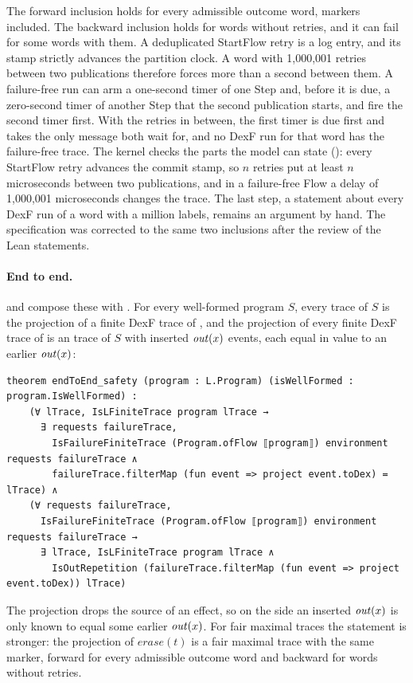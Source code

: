 The forward inclusion holds for every admissible outcome word, markers
included. The backward inclusion holds for words without retries, and it
can fail for some words with them. A deduplicated StartFlow retry is a log
entry, and its stamp strictly advances the partition clock. A word with
1,000,001 retries between two publications therefore forces more than a
second between them. A failure-free run can arm a one-second timer of one
Step and, before it is due, a zero-second timer of another Step that the
second publication starts, and fire the second timer first. With the
retries in between, the first timer is due first and takes the only
message both wait for, and no DexF run for that word has the failure-free
trace. The kernel checks the parts the model can state
(): every StartFlow retry advances
the commit stamp, so $n$ retries put at least $n$ microseconds between two
publications, and in a failure-free Flow a delay of 1,000,001 microseconds
changes the trace. The last step, a statement about every DexF run of a
word with a million labels, remains an argument by hand. The specification
was corrected to the same two inclusions after the review of the Lean
statements.

\paragraph{End to end.}
 and  compose these with
. For every well-formed \Lang{}
program $S$, every \Lang{} trace of $S$ is the projection of a finite DexF
trace of , and the projection of every finite DexF trace of  is
an \Lang{} trace of $S$ with inserted $\mathit{out}(x)$ events, each equal in
value to an earlier $\mathit{out}(x)$:
\begin{Verbatim}[fontsize=\scriptsize]
theorem endToEnd_safety (program : L.Program) (isWellFormed : program.IsWellFormed) :
    (∀ lTrace, IsLFiniteTrace program lTrace →
      ∃ requests failureTrace,
        IsFailureFiniteTrace (Program.ofFlow ⟦program⟧) environment requests failureTrace ∧
        failureTrace.filterMap (fun event => project event.toDex) = lTrace) ∧
    (∀ requests failureTrace,
      IsFailureFiniteTrace (Program.ofFlow ⟦program⟧) environment requests failureTrace →
      ∃ lTrace, IsLFiniteTrace program lTrace ∧
        IsOutRepetition (failureTrace.filterMap (fun event => project event.toDex)) lTrace)
\end{Verbatim}
The projection drops the source of an effect, so on the \Lang{} side an
inserted $\mathit{out}(x)$ is only known to equal some earlier $\mathit{out}(x)$.
For fair maximal traces the statement is stronger: the projection of
$\mathit{erase}(t)$ is a fair maximal \Lang{} trace with the same marker,
forward for every admissible outcome word and backward for words without
retries.


